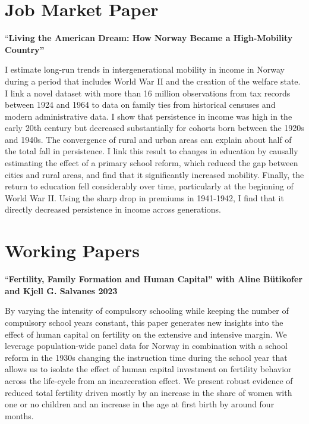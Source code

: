 \documentclass[11pt,]{article}
\begin{document}
\hypertarget{job-market-paper}{%
\section{Job Market Paper}\label{job-market-paper}}

``\textbf{Living the American Dream: How Norway Became a High-Mobility
Country''}

I estimate long-run trends in intergenerational mobility in income in
Norway during a period that includes World War II and the creation of
the welfare state. I link a novel dataset with more than 16 million
observations from tax records between 1924 and 1964 to data on family
ties from historical censuses and modern administrative data. I show
that persistence in income was high in the early 20th century but
decreased substantially for cohorts born between the 1920s and 1940s.
The convergence of rural and urban areas can explain about half of the
total fall in persistence. I link this result to changes in education by
causally estimating the effect of a primary school reform, which reduced
the gap between cities and rural areas, and find that it significantly
increased mobility. Finally, the return to education fell considerably
over time, particularly at the beginning of World War II. Using the
sharp drop in premiums in 1941-1942, I find that it directly decreased
persistence in income across generations. \vspace{0.3cm}\vspace{-0.2cm}

\vspace{0.5cm}

\clearpage

\hypertarget{working-papers}{%
\section{Working Papers}\label{working-papers}}

``\textbf{Fertility, Family Formation and Human Capital'' with Aline
Bütikofer and Kjell G. Salvanes \hfill 2023}

By varying the intensity of compulsory schooling while keeping the
number of compulsory school years constant, this paper generates new
insights into the effect of human capital on fertility on the extensive
and intensive margin. We leverage population-wide panel data for Norway
in combination with a school reform in the 1930s changing the
instruction time during the school year that allows us to isolate the
effect of human capital investment on fertility behavior across the
life-cycle from an incarceration effect. We present robust evidence of
reduced total fertility driven mostly by an increase in the share of
women with one or no children and an increase in the age at first birth
by around four months.\vspace{0.3cm}\vspace{-0.2cm}
\end{document}

